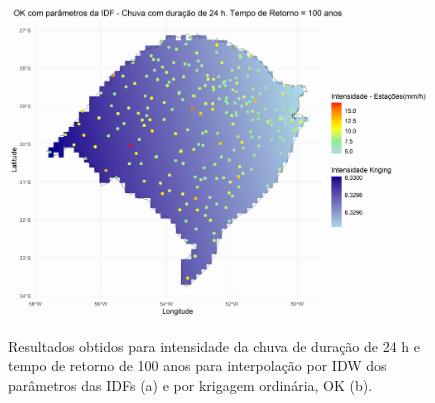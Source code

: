\documentclass[
]{agujournal2019}
\begin{document}
\begin{figure}
\begin{minipage}{\linewidth}
{\includegraphics{Figuras/Figura34b.png}

}


\end{minipage}%

\caption{\label{fig-Figura34}Resultados obtidos para intensidade da
chuva de duração de 24 h e tempo de retorno de 100 anos para
interpolação por IDW dos parâmetros das IDFs (a) e por krigagem
ordinária, OK (b).}

\end{figure}%
\end{document}
